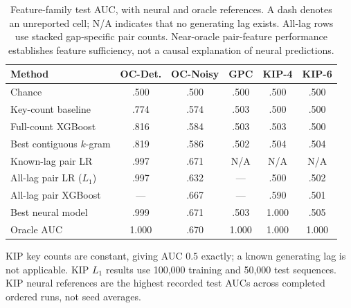 \begin{table}[htbp]
\centering\small
\caption{Feature-family test AUC, with neural and oracle references.
A dash denotes an unreported cell; N/A indicates that no generating lag exists.
All-lag rows use
stacked gap-specific pair counts. Near-oracle pair-feature performance
establishes feature sufficiency, not a causal explanation of neural predictions.}
\label{tab:signal_decomposition}
\begin{tabular}{lccccc}
\toprule
Method & OC-Det. & OC-Noisy & GPC & KIP-4 & KIP-6 \\
\midrule
Chance & .500 & .500 & .500 & .500 & .500 \\
Key-count baseline & .774 & .574 & .503 & .500 & .500 \\
Full-count XGBoost & .816 & .584 & .503 & .503 & .500 \\
Best contiguous \(k\)-gram & .819 & .586 & .502 & .504 & .504 \\
Known-lag pair LR & .997 & .671 & N/A & N/A & N/A \\
All-lag pair LR ($L_1$) & .997 & .632 & --- & .500 & .502 \\
All-lag pair XGBoost & --- & .667 & --- & .590 & .501 \\
Best neural model & .999 & .671 & .503 & 1.000 & .505 \\
Oracle AUC & 1.000 & .670 & 1.000 & 1.000 & 1.000 \\
\bottomrule
\end{tabular}
\par\smallskip
\begin{minipage}{\linewidth}
\footnotesize
KIP key counts are constant, giving AUC $0.5$ exactly; a known generating
lag is not applicable. KIP $L_1$ results use 100,000 training and 50,000
test sequences. KIP neural references are the highest recorded test AUCs
across completed ordered runs, not seed averages.
\end{minipage}
\end{table}
